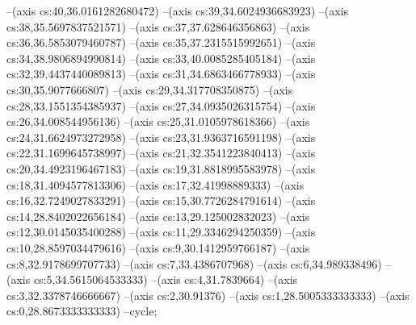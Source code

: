 --(axis cs:40,36.0161282680472)
--(axis cs:39,34.6024936683923)
--(axis cs:38,35.5697837521571)
--(axis cs:37,37.628646356863)
--(axis cs:36,36.5853079460787)
--(axis cs:35,37.2315515992651)
--(axis cs:34,38.9806894990814)
--(axis cs:33,40.0085285405184)
--(axis cs:32,39.4437440089813)
--(axis cs:31,34.6863466778933)
--(axis cs:30,35.9077666807)
--(axis cs:29,34.317708350875)
--(axis cs:28,33.1551354385937)
--(axis cs:27,34.0935026315754)
--(axis cs:26,34.008544956136)
--(axis cs:25,31.0105978618366)
--(axis cs:24,31.6624973272958)
--(axis cs:23,31.9363716591198)
--(axis cs:22,31.1699645738997)
--(axis cs:21,32.3541223840413)
--(axis cs:20,34.4923196467183)
--(axis cs:19,31.8818995583978)
--(axis cs:18,31.4094577813306)
--(axis cs:17,32.41998889333)
--(axis cs:16,32.7249027833291)
--(axis cs:15,30.7726284791614)
--(axis cs:14,28.8402022656184)
--(axis cs:13,29.125002832023)
--(axis cs:12,30.0145035400288)
--(axis cs:11,29.3346294250359)
--(axis cs:10,28.8597034479616)
--(axis cs:9,30.1412959766187)
--(axis cs:8,32.9178699707733)
--(axis cs:7,33.4386707968)
--(axis cs:6,34.989338496)
--(axis cs:5,34.5615064533333)
--(axis cs:4,31.7839664)
--(axis cs:3,32.3378746666667)
--(axis cs:2,30.91376)
--(axis cs:1,28.5005333333333)
--(axis cs:0,28.8673333333333)
--cycle;
